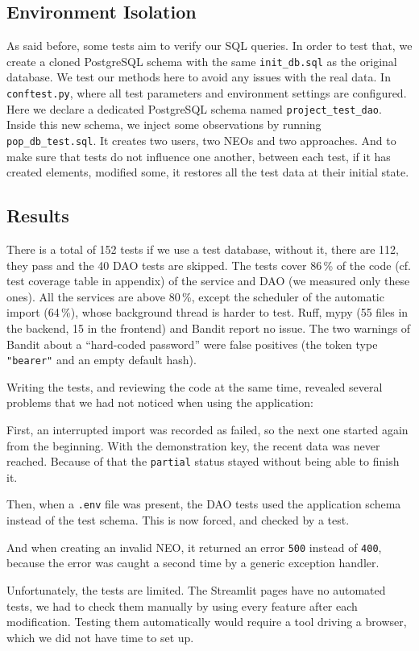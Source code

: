 \bigskip
\bigskip

\subsection{Environment Isolation}

\bigskip
\bigskip

As said before, some tests aim to verify our SQL queries. In order to test that, we create a cloned PostgreSQL schema with the same \texttt{init\_db.sql} as the original database. We test our methods here to avoid any issues with the real data. In \texttt{conftest.py}, where all test parameters and environment settings are configured. Here we declare a dedicated PostgreSQL schema named \texttt{project\_test\_dao}. Inside this new schema, we inject some observations by running \texttt{pop\_db\_test.sql}. It creates two users, two NEOs and two approaches. And to make sure that tests do not influence one another, between each test, if it has created elements, modified some, it restores all the test data at their initial state.

\bigskip

\subsection{Results}

There is a total of 152 tests if we use a test database, without it, there are 112, they pass and the 40 DAO tests are skipped. The tests cover 86\,\% of the code (cf. test coverage table in appendix) of the service and DAO (we measured only these ones). All the services are above 80\,\%, except the scheduler of the automatic import (64\,\%), whose background thread
is harder to test. Ruff, mypy (55 files in the backend, 15 in the frontend) and Bandit report no issue. The two warnings of Bandit about a ``hard-coded password'' were false positives (the
token type \texttt{"bearer"} and an empty default hash).

Writing the tests, and reviewing the code at the same time, revealed several problems that we had not noticed when using the application:

First, an interrupted import was recorded as failed, so the next one started again from the beginning. With the demonstration key, the recent data was never reached. Because of that the \texttt{partial} status stayed without being able to finish it.

Then, when a \texttt{.env} file was present, the DAO tests used the application schema instead of the test schema. This is now forced, and checked by a test.

And when creating an invalid NEO, it returned an error \texttt{500} instead of \texttt{400}, because the error was caught a second time by a generic exception handler.

\bigskip

Unfortunately, the tests are limited. The Streamlit pages have no automated tests, we had to check them manually by using every feature after each modification. Testing them automatically would
require a tool driving a browser, which we did not have time to set up.


\bigskip
\bigskip